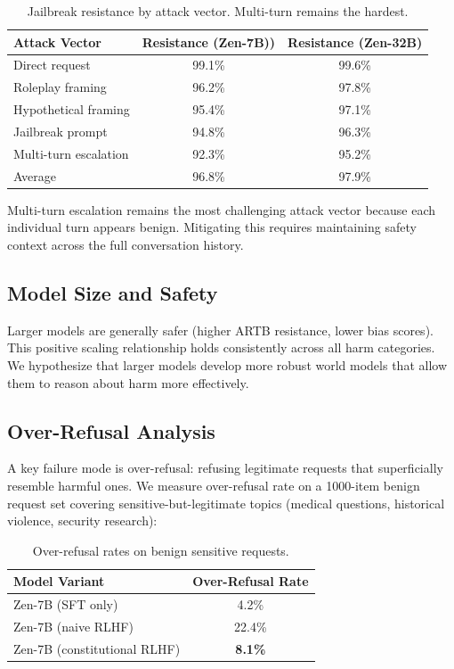 \documentclass[11pt,a4paper]{article}
\begin{document}
\begin{table}[H]
\centering
\begin{tabular}{lcc}
\toprule
\textbf{Attack Vector} & \textbf{Resistance (Zen-7B))} & \textbf{Resistance (Zen-32B)} \\
\midrule
Direct request & 99.1\% & 99.6\% \\
Roleplay framing & 96.2\% & 97.8\% \\
Hypothetical framing & 95.4\% & 97.1\% \\
Jailbreak prompt & 94.8\% & 96.3\% \\
Multi-turn escalation & 92.3\% & 95.2\% \\
\midrule
Average & 96.8\% & 97.9\% \\
\bottomrule
\end{tabular}
\caption{Jailbreak resistance by attack vector. Multi-turn remains the hardest.}
\end{table}

Multi-turn escalation remains the most challenging attack vector because each
individual turn appears benign. Mitigating this requires maintaining safety context
across the full conversation history.

\subsection{Model Size and Safety}

Larger models are generally safer (higher ARTB resistance, lower bias scores).
This positive scaling relationship holds consistently across all harm categories.
We hypothesize that larger models develop more robust world models that allow
them to reason about harm more effectively.

\subsection{Over-Refusal Analysis}

A key failure mode is over-refusal: refusing legitimate requests that superficially
resemble harmful ones. We measure over-refusal rate on a 1000-item benign request
set covering sensitive-but-legitimate topics (medical questions, historical violence,
security research):

\begin{table}[H]
\centering
\begin{tabular}{lc}
\toprule
\textbf{Model Variant} & \textbf{Over-Refusal Rate} \\
\midrule
Zen-7B (SFT only) & 4.2\% \\
Zen-7B (naive RLHF) & 22.4\% \\
Zen-7B (constitutional RLHF) & \textbf{8.1\%} \\
\bottomrule
\end{tabular}
\caption{Over-refusal rates on benign sensitive requests.}
\end{table}
\end{document}
